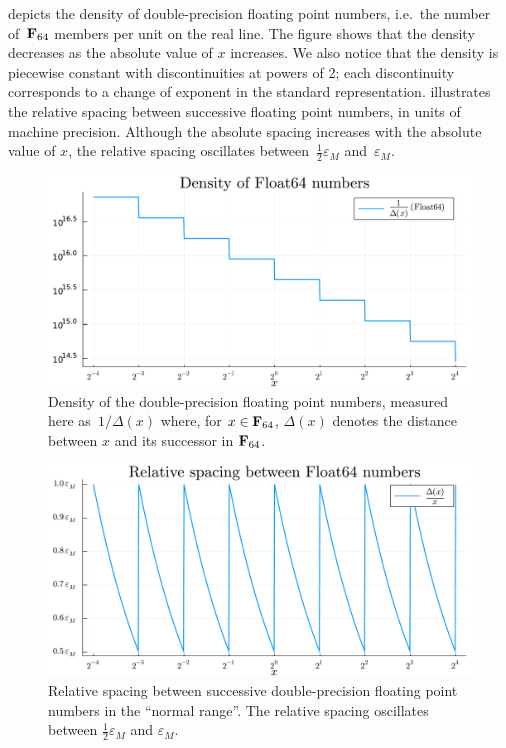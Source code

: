 depicts the density of double-precision floating point numbers,
i.e.\ the number of~$\mathbf F_{64}$ members per unit on the real line.
The figure shows that the density decreases as the absolute value of $x$ increases.
We also notice that the density is piecewise constant with discontinuities at powers of 2;
each discontinuity corresponds to a change of exponent in the standard representation.
 illustrates the relative spacing between successive floating point numbers,
in units of machine precision.
Although the absolute spacing increases with the absolute value of $x$,
the relative spacing oscillates between~$\frac{1}{2} \varepsilon_{M}$ and~$\varepsilon_M$.

\begin{figure}
    \centering
    \includegraphics[width=.8\textwidth]{figures/float64_density.pdf}
    \caption{%
        Density of the double-precision floating point numbers,
        measured here as~$1/\Delta(x)$ where,
        for $x \in \mathbf F_{64}$,
        $\Delta(x)$ denotes the distance between $x$ and its successor in $\mathbf F_{64}$.
    }%
    \label{fig:float64_density}%
\end{figure}

\begin{figure}[ht]
    \centering
    \includegraphics[width=.65\textwidth]{figures/float64_spacing.pdf}
    \caption{%
        Relative spacing between successive double-precision floating point numbers in the ``normal range''.
        The relative spacing oscillates between $\frac{1}{2} \varepsilon_M$ and $\varepsilon_M$.
    }%
    \label{fig:float64_spacing}
\end{figure}

